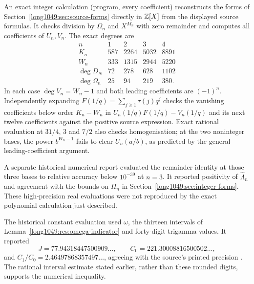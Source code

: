 \documentclass[11pt]{article}
\begin{document}
An exact integer calculation (\href{https://github.com/wcook04/plectis-erdos/blob/4beca4ad0c00a626def9c73f2420e20ebf8d1968/research/experiments/erdos1049/source_polynomials.py}{program}, \href{https://github.com/wcook04/plectis-erdos/blob/4beca4ad0c00a626def9c73f2420e20ebf8d1968/research/experiments/erdos1049/receipts/source-polynomials.json}{every coefficient}) reconstructs the forms of
Section~\ref{long1049:sec:source-forms}
directly in $\mathbb{Z}[X]$ from the displayed source formulas. It checks
division by $\Omega_n$ and $X^{M_n}$ with zero remainder and computes
all coefficients of $U_n,V_n$. The exact degrees are
\[
\begin{array}{c|rrrr}
 n&1&2&3&4\\\hline
 K_n&587&2264&5032&8891\\
 W_n&333&1315&2944&5220\\
 \deg D_N&72&278&628&1102\\
 \deg\Omega_n&25&94&219&380.
\end{array}
\]
In each case $\deg V_n=W_n-1$ and both leading coefficients are
$(-1)^n$. Independently expanding $F(1/q)=\sum_{j\ge1}\tau(j)q^j$
checks the vanishing coefficients below order $K_n-W_n$ in
$U_n(1/q)F(1/q)-V_n(1/q)$ and its next twelve coefficients against
the positive source expression. Exact rational evaluation at
$31/4$, $3$ and $7/2$ also checks homogenisation; at the two noninteger
bases, the power $b^{W_n-1}$ fails to clear $U_n(a/b)$, as predicted
by the general leading-coefficient argument.

A separate historical numerical report evaluated the remainder identity
at those three bases to relative accuracy below $10^{-39}$ at $n=3$.
It reported positivity of $\widehat\Lambda_n$ and agreement with the
bounds on $H_n$ in Section~\ref{long1049:sec:integer-forms}. These
high-precision real evaluations were not reproduced by the exact
polynomial calculation just described.

The historical constant evaluation used $\omega$, the thirteen intervals
of Lemma~\ref{long1049:res:omega-indicator} and forty-digit trigamma values.
It reported
\[
 J=77.94318447500909\ldots,\qquad C_0=221.30008816500502\ldots,
\]
and $C_1/C_0=2.46497868357497\ldots$, agreeing with the source's printed
precision \cite[p.~162]{zudilin2004}. The rational interval estimate stated earlier, rather than these
rounded digits, supports the numerical inequality.
\end{document}
